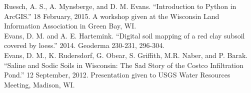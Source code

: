 \documentclass{article}
\begin{document}
\begin{small}
\leftskip 0.1in
\parindent -0.1in
Ruesch, A. S., A. Mynsberge, and D. M. Evans. ``Introduction to Python in ArcGIS.'' 18 February, 2015. A workshop given at the Wisconsin Land Information Association in Green Bay, WI.\\

Evans, D. M. and A. E. Hartemink. ``Digital soil mapping of a red clay subsoil covered by loess.'' 2014. Geoderma 230-231, 296-304.\\

Evans, D. M., K. Rudersdorf, G. Obear, S. Griffith, M.R. Naber, and P. Barak. ``Saline and Sodic Soils in Wisconsin: The Sad Story of the Costco Infiltration Pond.'' 12 September, 2012. Presentation given to USGS Water Resources Meeting, Madison, WI.\\


\end{small}
\end{document}
